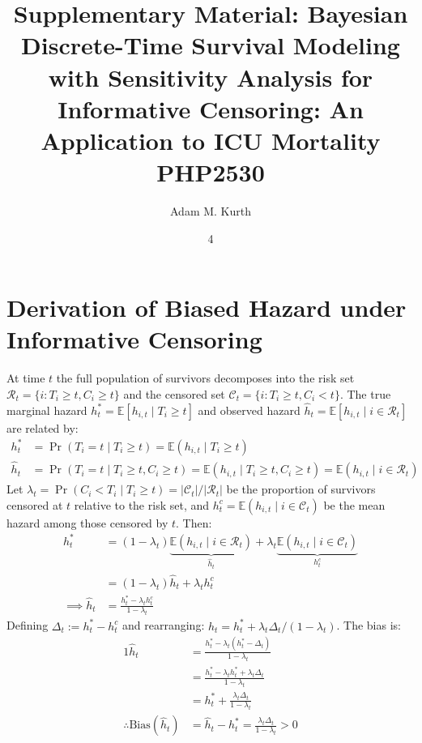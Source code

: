 \documentclass[twoside,11pt]{article}
\begin{document}
\title{Supplementary Material: Bayesian Discrete-Time Survival Modeling with Sensitivity Analysis for Informative Censoring: An Application to ICU Mortality\\
\vspace{.1in}
PHP2530
}

\author{Adam M. Kurth}
\date{4}

\maketitle

\section{Derivation of Biased Hazard under Informative Censoring} \label{app:biased-hazard}
At time $t$ the full population of survivors decomposes into the risk set $\mathcal{R}_t = \{i: T_i \geq t, C_i \geq t\}$ and the censored set $\mathcal{C}_t = \{i: T_i \geq t, C_i < t\}$. The true marginal hazard $h^\ast_t = \mathbb{E}[h_{i,t} \mid T_i \geq t]$ and observed hazard $\hat{h}_t = \mathbb{E}[h_{i,t} \mid i \in \mathcal{R}_t]$ are related by:
\begin{align*}
    h^\ast_t &= \Pr(T_i = t \mid T_i \geq t)
            = \mathbb{E}(h_{i,t} \mid T_i \geq t)\\
    \hat{h}_t &= \Pr(T_i = t \mid T_i \geq t, C_i \geq t)
            = \mathbb{E}(h_{i,t} \mid T_i \geq t, C_i \geq t)
            = \mathbb{E}(h_{i,t} \mid i \in \mathcal{R}_t)
\end{align*}
\noindent
Let $\lambda_t = \Pr(C_i < T_i \mid T_i \geq t) = |\mathcal{C}_t|/|\mathcal{R}_t|$ be the proportion of survivors censored at $t$ relative to the risk set, and $h^c_t = \mathbb{E}(h_{i,t} \mid i \in \mathcal{C}_t)$ be the mean hazard among those censored by $t$. Then:
\begin{align*}
    h^\ast_t &= (1-\lambda_t) \underbrace{
            \mathbb{E}(h_{i,t} \mid i \in \mathcal{R}_t)
        }_{\hat{h}_t}
        + \lambda_t \underbrace{
            \mathbb{E}(h_{i,t} \mid i \in \mathcal{C}_t)
        }_{h^c_t} \\
    &= (1 - \lambda_t) \hat{h}_t + \lambda_t h^c_t \\
    \implies   \hat{h}_t &= \frac{h^\ast_t - \lambda_t h^c_t}{1 - \lambda_t}
\end{align*}
Defining $\Delta_t := h^\ast_t - h^c_t$ and rearranging: $\hat{h}_t = h^\ast_t + \lambda_t \Delta_t / (1 - \lambda_t)$. The bias is:
\begin{alignat}{1}
    \hat{h}_t &= \frac{h^\ast_t - \lambda_t (h^\ast_t - \Delta_t)}{1 - \lambda_t} \nonumber \\
             &= \frac{h^\ast_t - \lambda_t h^\ast_t + \lambda_t \Delta_t}{1 - \lambda_t} \nonumber \\
             &= h^\ast_t + \frac{\lambda_t \Delta_t}{1 - \lambda_t} \nonumber \\
\therefore \mathrm{Bias}(\hat{h}_t) &= \hat{h}_t - h^\ast_t = \frac{\lambda_t \Delta_t}{1 - \lambda_t} > 0 \label{eq:bias-formula}
\end{alignat}
\end{document}
